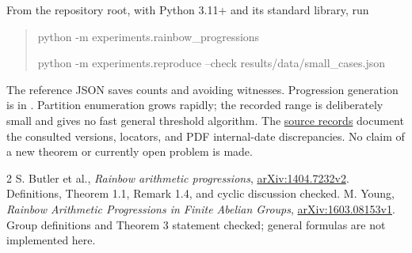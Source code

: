\documentclass[10pt,letterpaper]{article}
\begin{document}
From the repository root, with Python 3.11+ and its standard library, run
\begin{quote}\small\ttfamily
python -m experiments.rainbow\_progressions\par
python -m experiments.reproduce --check results/data/small\_cases.json
\end{quote}
The reference JSON saves counts and avoiding witnesses. Progression generation
is in . Partition enumeration grows
rapidly; the recorded range is deliberately small and gives no fast general
threshold algorithm. The
\href{https://github.com/Akhil-rav/discrete-math-lab/blob/main/notes/literature/source_records.md}{source records}
document the consulted versions, locators, and PDF internal-date discrepancies.
No claim of a new theorem or currently open problem is made.

\begin{thebibliography}{2}
 S. Butler et al., \emph{Rainbow arithmetic progressions},
\href{https://arxiv.org/abs/1404.7232v2}{arXiv:1404.7232v2}.
Definitions, Theorem 1.1, Remark 1.4, and cyclic discussion checked.
 M. Young, \emph{Rainbow Arithmetic Progressions in Finite Abelian Groups},
\href{https://arxiv.org/abs/1603.08153v1}{arXiv:1603.08153v1}.
Group definitions and Theorem 3 statement checked; general formulas are not
implemented here.
\end{thebibliography}
\end{document}
